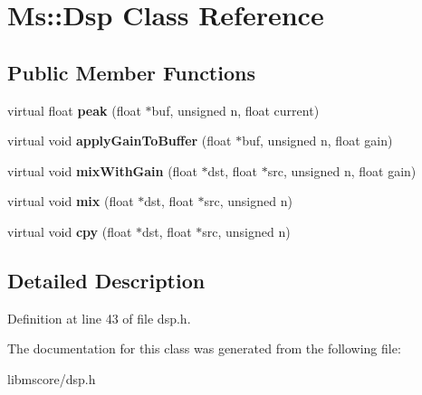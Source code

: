 \hypertarget{class_ms_1_1_dsp}{}\section{Ms\+:\+:Dsp Class Reference}
\label{class_ms_1_1_dsp}
\subsection*{Public Member Functions}
\begin{DoxyCompactItemize}
\item 
\mbox{\label{class_ms_1_1_dsp_a8150fe0cfcc460d6f27a2833636e0389}} 
virtual float {\bfseries peak} (float $\ast$buf, unsigned n, float current)
\item 
\mbox{\label{class_ms_1_1_dsp_ac51de0edbf64cf48d3b14d6f2c726c0c}} 
virtual void {\bfseries apply\+Gain\+To\+Buffer} (float $\ast$buf, unsigned n, float gain)
\item 
\mbox{\label{class_ms_1_1_dsp_a0c1ba51ece90f2f73bb7f7bb742ecba3}} 
virtual void {\bfseries mix\+With\+Gain} (float $\ast$dst, float $\ast$src, unsigned n, float gain)
\item 
\mbox{\label{class_ms_1_1_dsp_accf61a73e91a2da3cb2c130136499c92}} 
virtual void {\bfseries mix} (float $\ast$dst, float $\ast$src, unsigned n)
\item 
\mbox{\label{class_ms_1_1_dsp_aba71b0459a62d0f9e3783218acac16d2}} 
virtual void {\bfseries cpy} (float $\ast$dst, float $\ast$src, unsigned n)
\end{DoxyCompactItemize}


\subsection{Detailed Description}


Definition at line 43 of file dsp.\+h.



The documentation for this class was generated from the following file\+:\begin{DoxyCompactItemize}
\item 
libmscore/dsp.\+h\end{DoxyCompactItemize}
